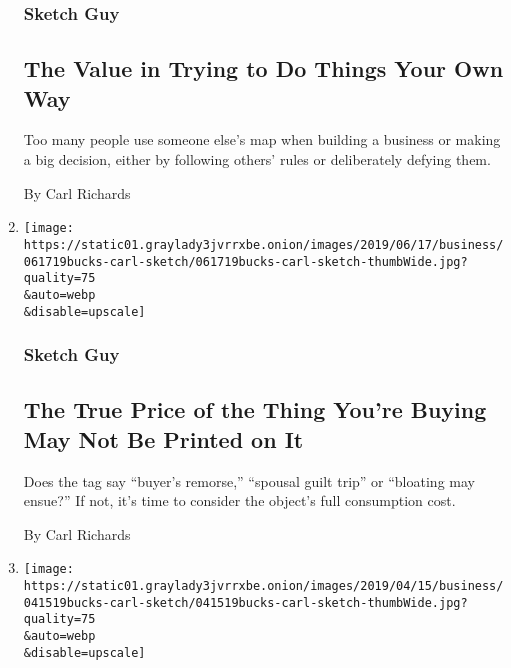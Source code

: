 \begin{enumerate}
  \hypertarget{sketch-guy-4}{%
  \subsubsection{Sketch Guy}\label{sketch-guy-4}}

  \hypertarget{the-value-in-trying-to-do-things-your-own-way}{%
  \subsection{The Value in Trying to Do Things Your Own
  Way}\label{the-value-in-trying-to-do-things-your-own-way}}

  Too many people use someone else's map when building a business or
  making a big decision, either by following others' rules or
  deliberately defying them.

  By Carl Richards
\item
  \href{/2019/06/17/business/the-true-price-of-the-thing-youre-buying-may-not-be-printed-on-it.html}{}

  \texttt{[image: https://static01.graylady3jvrrxbe.onion/images/2019/06/17/business/061719bucks-carl-sketch/061719bucks-carl-sketch-thumbWide.jpg?quality=75\\\&auto=webp\\\&disable=upscale]}

  \hypertarget{sketch-guy-5}{%
  \subsubsection{Sketch Guy}\label{sketch-guy-5}}

  \hypertarget{the-true-price-of-the-thing-youre-buying-may-not-be-printed-on-it}{%
  \subsection{The True Price of the Thing You're Buying May Not Be
  Printed on
  It}\label{the-true-price-of-the-thing-youre-buying-may-not-be-printed-on-it}}

  Does the tag say ``buyer's remorse,'' ``spousal guilt trip'' or
  ``bloating may ensue?'' If not, it's time to consider the object's
  full consumption cost.

  By Carl Richards
\item
  \href{/2019/04/17/your-money/one-step-at-a-time.html}{}

  \texttt{[image: https://static01.graylady3jvrrxbe.onion/images/2019/04/15/business/041519bucks-carl-sketch/041519bucks-carl-sketch-thumbWide.jpg?quality=75\\\&auto=webp\\\&disable=upscale]}


\end{enumerate}
